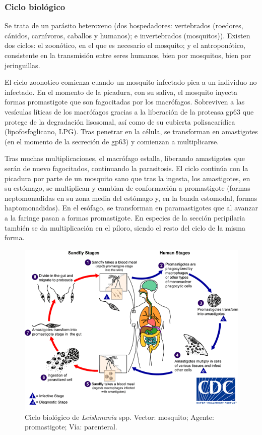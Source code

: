 \subsubsection{Ciclo biológico}
Se trata de un parásito heteroxeno (dos hospedadores: vertebrados (roedores, cánidos, carnívoros, caballos y humanos); e invertebrados (mosquitos)). Existen dos ciclos: el zoonótico, en el que es necesario el mosquito; y el antroponótico, consistente en la transmisión entre seres humanos, bien por mosquitos, bien por jeringuillas. 

El ciclo zoonotico comienza cuando un mosquito infectado pica a un individuo no infectado. En el momento de la picadura, con su saliva, el mosquito inyecta formas promastigote que son fagocitadas por los macrófagos. Sobreviven a las vesículas líticas de los macrófagos gracias a la liberación de la proteasa gp63 que protege de la degradación lisosomal, así como de su cubierta polisacarídica (lipofosfoglicano, LPG). Tras penetrar en la célula, se transforman en amastigotes (en el momento de la secreción de gp63) y comienzan a multiplicarse.
 
Tras muchas multiplicaciones, el macrófago estalla, liberando amastigotes que serán de nuevo fagocitados, continuando la parasitosis. El ciclo continúa con la picadura por parte de un mosquito sano que tras la ingesta, los amastigotes, en su estómago, se multiplican y cambian de conformación a promastigote (formas neptomonadidas en su zona media del estómago y, en la banda estomodal, formas haptomonadidas). En el esófago, se transforman en paramastigotes que al avanzar a la faringe pasan a formas promastigote. En especies de la sección peripilaria también se da multiplicación en el píloro, siendo el resto del ciclo de la misma forma.
\begin{figure}[H]
	\centering
	\includegraphics[width=0.75\columnwidth]{A.imagenes/ACV-BioSan-Parasit-LeishmaniaCBios}
	\caption[Ciclo biológico de \textit{Leishmania} spp]{Ciclo biológico de \textit{Leishmania} spp. Vector: mosquito; Agente: promastigote; Vía: parenteral.}
\end{figure}
